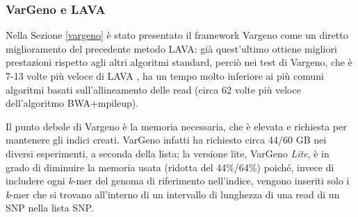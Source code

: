 \documentclass[../main.tex]{subfiles}
\begin{document}

\subsubsection{VarGeno e LAVA}

Nella Sezione \ref{vargeno} è stato presentato il framework Vargeno come un diretto miglioramento del precedente metodo LAVA: già quest'ultimo ottiene migliori prestazioni rispetto agli altri algoritmi standard, perciò nei test di \cite{sun-medvedev2018vargeno} Vargeno, che è 7-13 volte più veloce di LAVA , ha un tempo molto inferiore ai più comuni algoritmi basati sull'allineamento delle read (circa 62 volte più veloce dell'algoritmo BWA+mpileup). 

Il punto debole di Vargeno è la memoria necessaria, che è elevata e richiesta per mantenere gli indici creati. VarGeno infatti ha richiesto circa 44/60 GB nei diversi esperimenti, a seconda della lista; la versione lite, VarGeno \textit{Lite}, è in grado di diminuire la memoria usata (ridotta del 44\%/64\%) poiché, invece di includere ogni \textit{k}-mer del genoma di riferimento nell'indice, vengono inseriti solo i \textit{k}-mer che si trovano all'interno di un intervallo di lunghezza di una read di un SNP nella lista SNP. 
\end{document}
